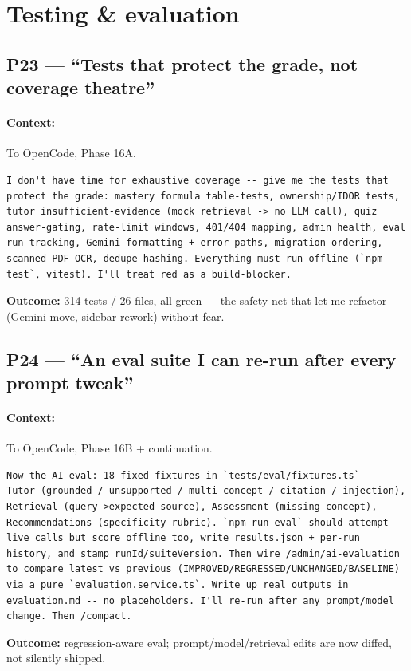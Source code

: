 \documentclass[11pt,a4paper]{article}
\begin{document}
\section{Testing \& evaluation}

\subsection{P23 --- ``Tests that protect the grade, not coverage theatre''}
\paragraph{Context:} To OpenCode, Phase 16A.
\begin{lstlisting}
I don't have time for exhaustive coverage -- give me the tests that protect the grade: mastery formula table-tests, ownership/IDOR tests, tutor insufficient-evidence (mock retrieval -> no LLM call), quiz answer-gating, rate-limit windows, 401/404 mapping, admin health, eval run-tracking, Gemini formatting + error paths, migration ordering, scanned-PDF OCR, dedupe hashing. Everything must run offline (`npm test`, vitest). I'll treat red as a build-blocker.
\end{lstlisting}
\textbf{Outcome:} 314 tests / 26 files, all green --- the safety net that let me refactor (Gemini move, sidebar rework) without fear.

\subsection{P24 --- ``An eval suite I can re-run after every prompt tweak''}
\paragraph{Context:} To OpenCode, Phase 16B + continuation.
\begin{lstlisting}
Now the AI eval: 18 fixed fixtures in `tests/eval/fixtures.ts` -- Tutor (grounded / unsupported / multi-concept / citation / injection), Retrieval (query->expected source), Assessment (missing-concept), Recommendations (specificity rubric). `npm run eval` should attempt live calls but score offline too, write results.json + per-run history, and stamp runId/suiteVersion. Then wire /admin/ai-evaluation to compare latest vs previous (IMPROVED/REGRESSED/UNCHANGED/BASELINE) via a pure `evaluation.service.ts`. Write up real outputs in evaluation.md -- no placeholders. I'll re-run after any prompt/model change. Then /compact.
\end{lstlisting}
\textbf{Outcome:} regression-aware eval; prompt/model/retrieval edits are now diffed, not silently shipped.
\end{document}
